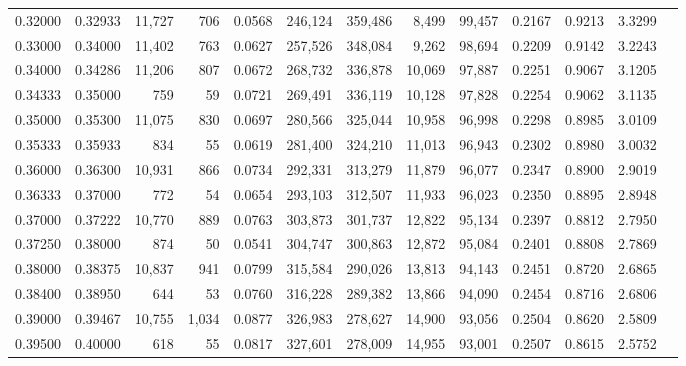 \begin{tabular}{rrrrrrrrrrrrr}
0.32000 & 0.32933 & 11,727 &   706 &                                     0.0568 & 246,124 & 359,486 &   8,499 &  99,457 & 0.2167 & 0.9213 & 3.3299 \\
0.33000 & 0.34000 & 11,402 &   763 &                                     0.0627 & 257,526 & 348,084 &   9,262 &  98,694 & 0.2209 & 0.9142 & 3.2243 \\
0.34000 & 0.34286 & 11,206 &   807 &                                     0.0672 & 268,732 & 336,878 &  10,069 &  97,887 & 0.2251 & 0.9067 & 3.1205 \\
0.34333 & 0.35000 &    759 &    59 &                                     0.0721 & 269,491 & 336,119 &  10,128 &  97,828 & 0.2254 & 0.9062 & 3.1135 \\
0.35000 & 0.35300 & 11,075 &   830 &                                     0.0697 & 280,566 & 325,044 &  10,958 &  96,998 & 0.2298 & 0.8985 & 3.0109 \\
0.35333 & 0.35933 &    834 &    55 &                                     0.0619 & 281,400 & 324,210 &  11,013 &  96,943 & 0.2302 & 0.8980 & 3.0032 \\
0.36000 & 0.36300 & 10,931 &   866 &                                     0.0734 & 292,331 & 313,279 &  11,879 &  96,077 & 0.2347 & 0.8900 & 2.9019 \\
0.36333 & 0.37000 &    772 &    54 &                                     0.0654 & 293,103 & 312,507 &  11,933 &  96,023 & 0.2350 & 0.8895 & 2.8948 \\
0.37000 & 0.37222 & 10,770 &   889 &                                     0.0763 & 303,873 & 301,737 &  12,822 &  95,134 & 0.2397 & 0.8812 & 2.7950 \\
0.37250 & 0.38000 &    874 &    50 &                                     0.0541 & 304,747 & 300,863 &  12,872 &  95,084 & 0.2401 & 0.8808 & 2.7869 \\
0.38000 & 0.38375 & 10,837 &   941 &                                     0.0799 & 315,584 & 290,026 &  13,813 &  94,143 & 0.2451 & 0.8720 & 2.6865 \\
0.38400 & 0.38950 &    644 &    53 &                                     0.0760 & 316,228 & 289,382 &  13,866 &  94,090 & 0.2454 & 0.8716 & 2.6806 \\
0.39000 & 0.39467 & 10,755 & 1,034 &                                     0.0877 & 326,983 & 278,627 &  14,900 &  93,056 & 0.2504 & 0.8620 & 2.5809 \\
0.39500 & 0.40000 &    618 &    55 &                                     0.0817 & 327,601 & 278,009 &  14,955 &  93,001 & 0.2507 & 0.8615 & 2.5752 \\

\end{tabular}
